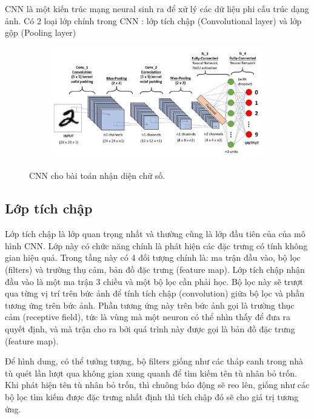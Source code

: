 CNN là một kiến trúc mạng neural sinh ra để xử lý các dữ liệu phi cấu trúc dạng ảnh. Có 2 loại lớp
chính trong CNN : lớp tích chập (Convolutional layer) và lớp gộp (Pooling layer)

\begin{figure}
    \begin{subfigure}{1.\textwidth}
        \includegraphics[width=1.\linewidth]{Chapters/items/cnn2_1.jpg}
        \label{fig:chap2_2}
    \end{subfigure}
    \caption{CNN cho bài toán nhận diện chữ số.}
\end{figure}
\subsection{Lớp tích chập}

Lớp tích chập là lớp quan trọng nhất và thường cũng là lớp đầu tiên của của mô hình CNN.
Lớp này có chức năng chính là phát hiện các đặc trưng có tính không gian hiệu quả.
Trong tầng này có 4 đối tượng chính là: ma trận đầu vào, bộ lọc (filters) và trường thụ cảm,
bản đồ đặc trưng (feature map). Lớp tích chập nhận đầu vào là một ma trận 3 chiều và một bộ lọc cần phải học.
Bộ lọc này sẽ trượt qua từng vị trí trên bức ảnh để tính tích chập (convolution)
giữa bộ lọc và phần tương ứng trên bức ảnh. Phần tương ứng này trên bức ảnh gọi là
trường thục cảm (receptive field), tức là vùng mà một neuron có thể nhìn thấy để đưa
ra quyết định, và mà trận cho ra bởi quá trình này được gọi là bản đồ đặc trưng (feature map).

Để hình dung, có thể tưởng tượng, bộ filters giống như các tháp canh trong nhà tù quét
lần lượt qua không gian xung quanh để tìm kiếm tên tù nhân bỏ trốn.
Khi phát hiện tên tù nhân bỏ trốn, thì chuông báo động sẽ reo lên, giống như các bộ lọc
tìm kiếm được đặc trưng nhất định thì tích chập đó sẽ cho giá trị tương ứng.


